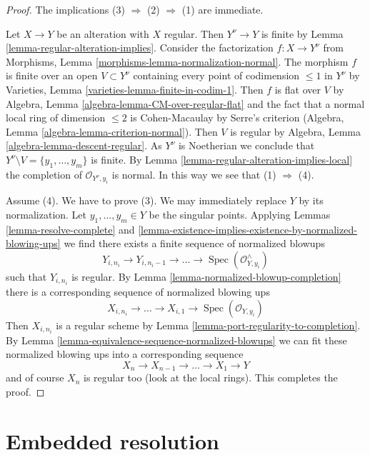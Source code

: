 \documentclass{stacks-project}
\theoremstyle{plain}
\theoremstyle{definition}
\theoremstyle{remark}
\numberwithin{equation}{subsection}
\def\Spec{\mathop{\mathrm{Spec}}}
\begin{document}
\begin{proof}
The implications (3) $\Rightarrow$ (2) $\Rightarrow$ (1) are immediate.

\medskip\noindent
Let $X \to Y$ be an alteration with $X$ regular. Then $Y^\nu \to Y$
is finite by Lemma \ref{lemma-regular-alteration-implies}.
Consider the factorization $f : X \to Y^\nu$ from 
Morphisms, Lemma \ref{morphisms-lemma-normalization-normal}.
The morphism $f$ is finite over an open $V \subset Y^\nu$ containing
every point of codimension $\leq 1$ in $Y^\nu$
by Varieties, Lemma \ref{varieties-lemma-finite-in-codim-1}.
Then $f$ is flat over $V$ by
Algebra, Lemma \ref{algebra-lemma-CM-over-regular-flat}
and the fact that a normal local ring
of dimension $\leq 2$ is Cohen-Macaulay by Serre's criterion
(Algebra, Lemma \ref{algebra-lemma-criterion-normal}).
Then $V$ is regular by Algebra, Lemma \ref{algebra-lemma-descent-regular}.
As $Y^\nu$ is Noetherian we conclude that
$Y^\nu \setminus V = \{y_1, \ldots, y_m\}$ is finite.
By Lemma \ref{lemma-regular-alteration-implies-local}
the completion of $\mathcal{O}_{Y^\nu, y_i}$ is normal.
In this way we see that (1) $\Rightarrow$ (4).

\medskip\noindent
Assume (4). We have to prove (3). We may immediately replace
$Y$ by its normalization. Let $y_1, \ldots, y_m \in Y$ be the
singular points. Applying
Lemmas \ref{lemma-resolve-complete} and
\ref{lemma-existence-implies-existence-by-normalized-blowing-ups}
we find  there exists a finite sequence of normalized blowups
$$
Y_{i, n_i} \to Y_{i, n_i - 1} \to \ldots \to \Spec(\mathcal{O}^\wedge_{Y, y_i})
$$
such that $Y_{i, n_i}$ is regular. By
Lemma \ref{lemma-normalized-blowup-completion}
there is a corresponding sequence of normalized blowing ups
$$
X_{i, n_i} \to \ldots \to X_{i, 1} \to \Spec(\mathcal{O}_{Y, y_i})
$$
Then $X_{i, n_i}$ is a regular scheme by
Lemma \ref{lemma-port-regularity-to-completion}.
By Lemma \ref{lemma-equivalence-sequence-normalized-blowups}
we can fit these normalized blowing ups
into a corresponding sequence
$$
X_n \to X_{n - 1} \to \ldots \to X_1 \to Y
$$
and of course $X_n$ is regular too (look at the local rings).
This completes the proof.
\end{proof}






\section{Embedded resolution}
\label{section-embedded}
\end{document}
